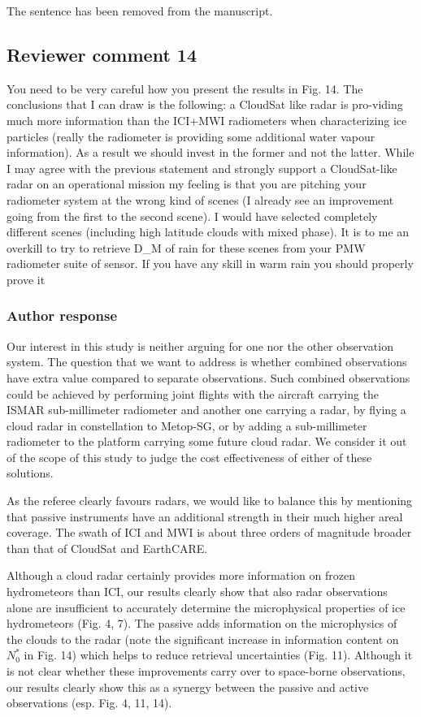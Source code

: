 The sentence has been removed from the manuscript.

\subsection*{Reviewer comment 14}
You need to be very careful how you present the results in Fig. 14. The
conclusions that I can draw is the following: a CloudSat like radar is
pro-viding much more information than the ICI+MWI radiometers when
characterizing ice particles (really the radiometer is providing some additional
water vapour information). As a result we should invest in the former and not the
latter. While I may agree with the previous statement and strongly support a
CloudSat-like radar on an operational mission my feeling is that you are
pitching your radiometer system at the wrong kind of scenes (I already see an
improvement going from the first to the second scene). I would have selected
completely different scenes (including high latitude clouds with mixed phase). It
is to me an overkill to try to retrieve D\_M of rain for these scenes from your
PMW radiometer suite of sensor. If you have any skill in warm rain you
should properly prove it

\subsubsection*{Author response}

Our interest in this study is neither arguing for one nor the other observation
system. The question that we want to address is whether combined observations
have extra value compared to separate observations. Such combined observations
could be achieved by performing joint flights with the aircraft carrying the
ISMAR sub-millimeter radiometer and another one carrying a radar, by flying a
cloud radar in constellation to Metop-SG, or by adding a sub-millimeter
radiometer to the platform carrying some future cloud radar. We consider it out
of the scope of this study to judge the cost effectiveness of either of these
solutions.

As the referee clearly favours radars, we would like to balance this by mentioning that
passive instruments have an additional strength in their much higher areal coverage. The
swath of ICI and MWI is about three orders of magnitude broader than that of CloudSat
and EarthCARE.

Although a cloud radar certainly provides more information on frozen
hydrometeors than ICI, our results clearly show that also radar observations
alone are insufficient to accurately determine the microphysical properties of
ice hydrometeors (Fig. 4, 7). The passive adds information on the microphysics
of the clouds to the radar (note the significant increase in information content
on $N_0^*$ in Fig. 14) which helps to reduce retrieval uncertainties (Fig. 11).
Although it is not clear whether these improvements carry over to space-borne
observations, our results clearly show this as a synergy between the passive and
active observations (esp. Fig. 4, 11, 14).

